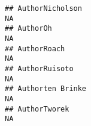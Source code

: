 \documentclass[]{article}
\begin{document}
\begin{verbatim}
## AuthorNicholson                                                                                                                                                                                                                                                                                                                                                                                                                                                                       NA
## AuthorOh                                                                                                                                                                                                                                                                                                                                                                                                                                                                              NA
## AuthorRoach                                                                                                                                                                                                                                                                                                                                                                                                                                                                           NA
## AuthorRuisoto                                                                                                                                                                                                                                                                                                                                                                                                                                                                         NA
## Authorten Brinke                                                                                                                                                                                                                                                                                                                                                                                                                                                                      NA
## AuthorTworek                                                                                                                                                                                                                                                                                                                                                                                                                                                                          NA

\end{verbatim}
\end{document}
